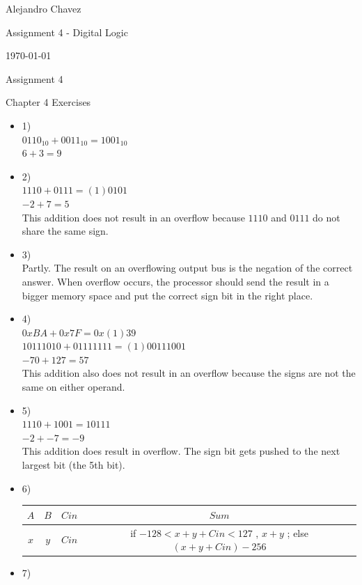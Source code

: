 \documentclass{article}
\begin{document}
\hfill Alejandro Chavez

\hfill Assignment 4 - Digital Logic

\hfill \today\\

\begin{center}\begin{large}Assignment 4\end{large}\end{center}	Chapter 4 Exercises
\begin{itemize}
	\item
		1)\\
		$0110_{10} + 0011_{10} = 1001_{10}$\\
		$6+3 =9$
	\item
		2)\\
		$1110 + 0111 = (1)0101$\\
		$-2 + 7 = 5$\\
		This addition does not result in an overflow because $1110$ and $0111$ do not share the same sign. 
	\item
		3)\\
    Partly. The result on an overflowing output bus is the negation of the correct answer. When overflow occurs, the processor should send the result in a bigger memory space and put the correct sign bit in the right place.
  \item
    4)\\
    $0xBA+0x7F=0x(1)39$\\
    $10111010+01111111=(1)00111001$\\
    $-70+127=57$\\
    This addition also does not result in an overflow because the signs are not the same on either operand.
  \item
    5)\\
    $1110 +1001 = 10111$\\
    $-2 + -7 = -9$\\
    This addition does result in overflow. The sign bit gets pushed to the next largest bit (the 5th bit).
  \item
    6)\\
    \begin{tabular}{ccc|c}
    $A$ & $B$ & $Cin$ & $Sum$ \\ \hline
    $x$ & $y$ & $Cin$ & if $-128<x+y+Cin<127$ , $x+y$ ; else $(x+y+Cin)-256$\\
    \end{tabular}
  \item
    7)\\

\end{itemize}
\end{document}
